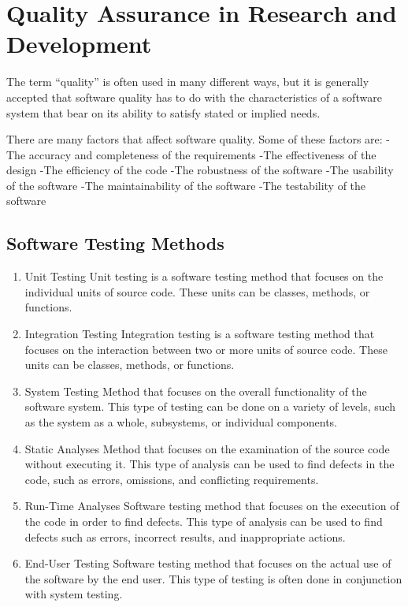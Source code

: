 \documentclass[lettersize,journal]{IEEEtran}
\begin{document}
\section{Quality Assurance in Research and Development}
The term “quality” is often used in many different ways, but it is generally accepted that software quality has to do with the characteristics of a software system that bear on its ability to satisfy stated or implied needs. 

There are many factors that affect software quality. Some of these factors are: 
-The accuracy and completeness of the requirements
-The effectiveness of the design
-The efficiency of the code
-The robustness of the software
-The usability of the software
-The maintainability of the software
-The testability of the software

\subsection{Software Testing Methods}

\begin{enumerate}
\item Unit Testing
Unit testing is a software testing method that focuses on the individual units of source code. These units can be classes, methods, or functions.

\item Integration Testing
Integration testing is a software testing method that focuses on the interaction between two or more units of source code. These units can be classes, methods, or functions.

\item System Testing
Method that focuses on the overall functionality of the software system. This type of testing can be done on a variety of levels, such as the system as a whole, subsystems, or individual components.

\item Static Analyses
Method that focuses on the examination of the source code without executing it. This type of analysis can be used to find defects in the code, such as errors, omissions, and conflicting requirements.

\item Run-Time Analyses
Software testing method that focuses on the execution of the code in order to find defects. This type of analysis can be used to find defects such as errors, incorrect results, and inappropriate actions.

\item End-User Testing
Software testing method that focuses on the actual use of the software by the end user. This type of testing is often done in conjunction with system testing.
\end{enumerate}
\end{document}
